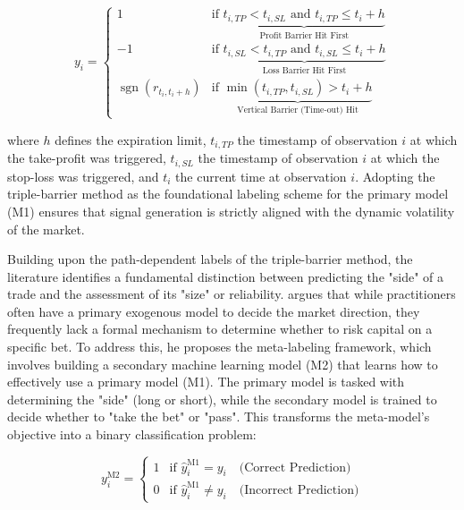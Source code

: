 \documentclass[12pt, a4paper]{article}
\begin{document}
\begin{equation}
y_i = \begin{cases}
1 & \text{if } \underbrace{t_{i, TP} < t_{i, SL} \text{ and } t_{i, TP} \leq t_i + h}_{\text{Profit Barrier Hit First}} \\
-1 & \text{if } \underbrace{t_{i, SL} < t_{i, TP} \text{ and } t_{i, SL} \leq t_i + h}_{\text{Loss Barrier Hit First}} \\
\operatorname{sgn}(r_{t_i, t_i+h}) & \text{if } \underbrace{\min(t_{i, TP}, t_{i, SL}) > t_i + h}_{\text{Vertical Barrier (Time-out) Hit}}
\end{cases}
\label{eq:tbm_binary}
\end{equation}

where \( h \) defines the expiration limit, \( t_{i, TP} \) the timestamp of observation \( i \) at which the take-profit was triggered, 
\(t_{i, SL} \) the timestamp of observation \( i \) at which the stop-loss was triggered, and \( t_i \) the current time at observation \( i \).
Adopting the triple-barrier method as the foundational labeling scheme for the primary model (M1) ensures that signal generation is 
strictly aligned with the dynamic volatility of the market.

\medskip

Building upon the path-dependent labels of the triple-barrier method, the literature identifies a fundamental distinction between predicting the 
"side" of a trade and the assessment of its "size" or reliability. \textcite{lopez_de_prado_advances_2018} argues that while practitioners often have a 
primary exogenous model to decide the market direction, they frequently lack a formal mechanism to determine whether to risk capital on a specific bet. 
To address this, he proposes the meta-labeling framework, which involves building a secondary machine learning model (M2) that learns how to 
effectively use a primary model (M1). The primary model is tasked with determining the "side" (long or short), 
while the secondary model is trained to decide whether to "take the bet" or "pass". 
This transforms the meta-model's objective into a binary classification problem:

\begin{equation}
y_i^{\text{M2}} = \begin{cases}
1 & \text{if } \hat{y}_i^{\text{M1}} = y_i \quad \text{(Correct Prediction)} \\
0 & \text{if } \hat{y}_i^{\text{M1}} \neq y_i \quad \text{(Incorrect Prediction)}
\label{eq:meta_label}
\end{cases}
\end{equation}
\end{document}
